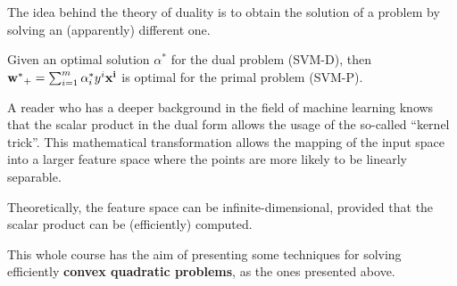 \documentclass[computationalMathematics.tex]{subfiles}
\begin{document}
\noindent The idea behind the theory of duality is to obtain the solution of a problem by solving an (apparently) different one.

\begin{lemma}
Given an optimal solution $\alpha^*$ for  the dual problem (SVM-D), then ${\bf w^* }_+ = \sum_{i=1}^{m} \alpha_i^* y^i {\bf x^i }$ is optimal for the primal problem (SVM-P).
\end{lemma}

A reader who has a deeper background in the field of machine learning knows that the scalar product in the dual form allows the usage of the so-called ``kernel trick''.
This mathematical transformation allows the mapping of the input space into a larger feature space where the points are more likely to be linearly separable.

Theoretically, the feature space can be infinite-dimensional, provided that the scalar product can be (efficiently) computed.

This whole course has the aim of presenting some techniques for solving efficiently \textbf{convex quadratic problems}, as the ones presented above.
\end{document}
